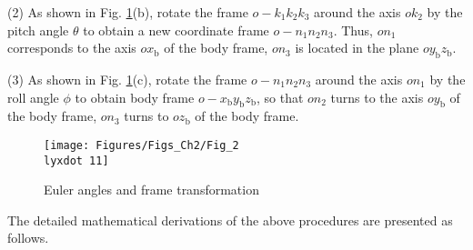 (2) As shown in Fig. \ref{Fig_2.11}(b), rotate the frame $o-{{k}_{1}}{{k}_{2}}{{k}_{3}}$
around the axis $o{{k}_{2}}$ by the pitch angle $\theta$ to obtain
a new coordinate frame $o-{{n}_{1}}{{n}_{2}}{{n}_{3}}$. Thus, $o{{n}_{1}}$
corresponds to the axis $o{{x}_{\text{b}}}$ of the body frame, $o{{n}_{3}}$
is located in the plane $o{{y}_{\text{b}}}{{z}_{\text{b}}}$.

(3) As shown in Fig. \ref{Fig_2.11}(c), rotate the frame $o-{{n}_{1}}{{n}_{2}}{{n}_{3}}$
around the axis $o{{n}_{1}}$ by the roll angle $\phi$ to obtain
body frame $o-{{x}_{\text{b}}}{{y}_{\text{b}}}{{z}_{\text{b}}}$,
so that $o{{n}_{2}}$ turns to the axis $o{{y}_{\text{b}}}$ of the
body frame, $o{{n}_{3}}$ turns to $o{{z}_{\text{b}}}$ of the body
frame. 

\begin{figure}
	\begin{centering}
		\texttt{[image: Figures/Figs\_Ch2/Fig\_2\\lyxdot 11]}
		\par\end{centering}
	\caption{Euler angles and frame transformation}
	
	\centering{}\label{Fig_2.11}
\end{figure}

The detailed mathematical derivations of the above procedures are
presented as follows.

